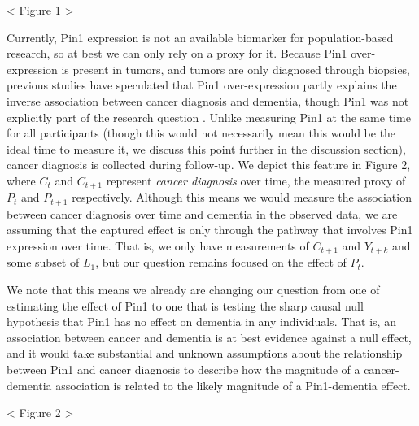 \documentclass[
]{book}
\begin{document}
\textless{} Figure 1 \textgreater{}

Currently, Pin1 expression is not an available biomarker for population-based research, so at best we can only rely on a proxy for it. Because Pin1 over-expression is present in tumors, and tumors are only diagnosed through biopsies, previous studies have speculated that Pin1 over-expression partly explains the inverse association between cancer diagnosis and dementia, though Pin1 was not explicitly part of the research question \autocite{driver2012,musicco2013,freedman2016,bowles2017,frain2017,schmidt2017,sun2020,ording2020}. Unlike measuring Pin1 at the same time for all participants (though this would not necessarily mean this would be the ideal time to measure it, we discuss this point further in the discussion section), cancer diagnosis is collected during follow-up. We depict this feature in Figure 2, where \(C_t\) and \(C_{t+1}\) represent \emph{cancer diagnosis} over time, the measured proxy of \(P_{t}\) and \(P_{t+1}\) respectively. Although this means we would measure the association between cancer diagnosis over time and dementia in the observed data, we are assuming that the captured effect is only through the pathway that involves Pin1 expression over time. That is, we only have measurements of \(C_{t+1}\) and \(Y_{t+k}\) and some subset of \(L_1\), but our question remains focused on the effect of \(P_t\).

We note that this means we already are changing our question from one of estimating the effect of Pin1 to one that is testing the sharp causal null hypothesis that Pin1 has no effect on dementia in any individuals. That is, an association between cancer and dementia is at best evidence against a null effect, and it would take substantial and unknown assumptions about the relationship between Pin1 and cancer diagnosis to describe how the magnitude of a cancer-dementia association is related to the likely magnitude of a Pin1-dementia effect.

\textless{} Figure 2 \textgreater{}
\end{document}
